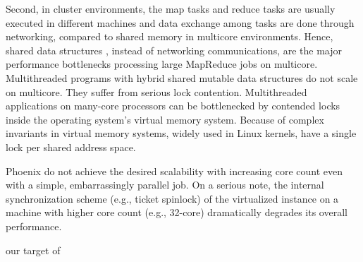Second, in cluster environments, 
the map tasks and reduce tasks are usually 
executed in different machines and data exchange among
tasks are done through networking, 
compared to shared memory in multicore environments. 
Hence, shared data structures , 
instead of networking communications, 
are the major performance bottlenecks processing large MapReduce jobs on multicore.
Multithreaded programs with hybrid shared mutable
data structures do not scale on multicore.
They suffer from serious lock contention.
Multithreaded applications on many-core processors can be
bottlenecked by contended locks inside the operating system’s
virtual memory system. 
Because of complex invariants in virtual memory systems, 
widely used in Linux kernels, 
have a single lock per shared address space. 
\cite{clements2013radixvm}


Phoenix do not achieve the desired scalability with increasing core count 
even with a simple, embarrassingly parallel job.
On a serious note, the internal
synchronization scheme (e.g., ticket spinlock) of
the virtualized instance on a machine with higher core count (e.g.,
32-core) dramatically degrades its overall performance.

{\color{red}our target of \myds}



